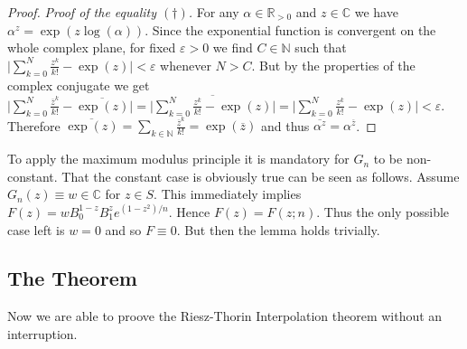 \begin{proof}
					\emph{Proof of the equality $(\dagger)$.} For any $\alpha \in \mathbb{R}_{>0}$ and $z \in \mathbb{C}$ we have $\alpha^z = \exp(z \log(\alpha))$. Since the exponential function is convergent on the whole complex plane, for fixed $\varepsilon > 0$ we find $C \in \mathbb{N}$ such that $\vert \sum_{k = 0}^N \frac{z^k}{k!} - \exp(z) \vert < \varepsilon$ whenever $N > C$. But by the properties of the complex conjugate we get $\vert \sum_{k = 0}^N \frac{\overline{z}^k}{k!} - \overline{\exp(z)} \vert = \vert \overline{\sum_{k = 0}^N \frac{z^k}{k!} - \exp(z)} \vert =\vert \sum_{k = 0}^N \frac{z^k}{k!} - \exp(z) \vert < \varepsilon $. Therefore $\overline{\exp(z)} = \sum_{k \in \mathbb{N}} \frac{\overline{z}^k}{k!} = \exp(\overline{z})$ and thus $\overline{\alpha^z} = \alpha^{\overline{z}}$.
		\end{proof}


		\begin{remark}
			To apply the maximum modulus principle it is mandatory for $G_n$ to be non-constant. That the constant case is obviously true can be seen as follows. Assume $G_n(z) \equiv w \in \mathbb{C}$ for $z \in S$. This immediately implies $F(z) = w B_0^{1 - z}B_1^z e^{(1 - z^2)/n}$. Hence $F(z) = F(z;n)$. Thus the only possible case left is $w = 0$ and so $F \equiv 0$. But then the lemma holds trivially.
		\end{remark}

		\subsection{The Theorem}
		Now we are able to proove the Riesz-Thorin Interpolation theorem without an interruption.

\vspace{2mm}


